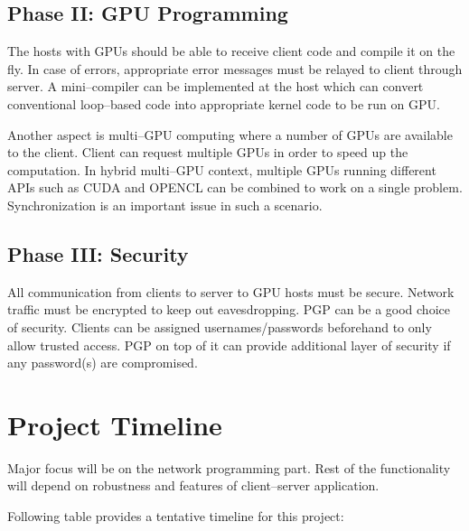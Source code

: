 \documentclass[11pt,a4paper]{article}
\begin{document}
\subsection{Phase II: GPU Programming}
The hosts with GPUs should be able to receive client code and compile it on the fly. In case of errors, appropriate error messages must be relayed to client through server. A mini--compiler can be implemented at the host which can convert conventional loop--based code into appropriate kernel code to be run on GPU. 

Another aspect is multi--GPU computing where a number of GPUs are available to the client. Client can request multiple GPUs in order to speed up the computation. In hybrid multi--GPU context, multiple GPUs running different APIs such as CUDA and OPENCL can be combined to work on a single problem. Synchronization is an important issue in such a scenario.

\subsection{Phase III: Security}
All communication from clients to server to GPU hosts must be secure. Network traffic must be encrypted to keep out eavesdropping. PGP can be a good choice of security. Clients can be assigned usernames/passwords beforehand to only allow trusted access. PGP on top of it can provide additional layer of security if any password(s) are compromised.

\section{Project Timeline}

Major focus will be on the network programming part. Rest of the functionality will depend on robustness and features of client--server application.

Following table provides a tentative timeline for this project:
\end{document}
